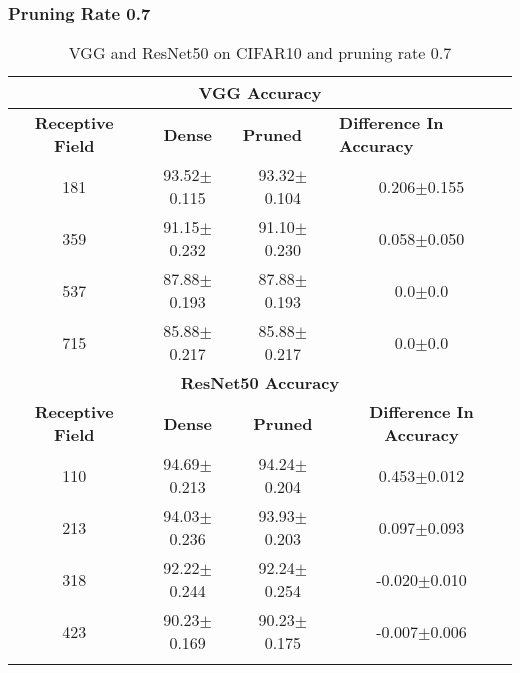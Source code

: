 \subsubsection*{Pruning Rate 0.7}
\begin{table}[H]
  \centering
\begin{tabular}{@{}cccc@{}}
\toprule
\multicolumn{4}{c}{\textbf{VGG Accuracy}}                                                                                                                                  \\ \midrule
\textbf{Receptive Field} & \textbf{Dense} & \multicolumn{1}{l}{\textbf{Pruned}} & \multicolumn{1}{l}{\textbf{Difference In Accuracy}} \\ \midrule
181                      & 93.52$\pm$0.115              & 93.32$\pm$0.104                                   & 0.206$\pm$0.155                                     \\
359                      & 91.15$\pm$0.232              & 91.10$\pm$0.230                                   & 0.058$\pm$0.050                                     \\
537                      & 87.88$\pm$0.193              & 87.88$\pm$0.193                                   & 0.0$\pm$0.0                                         \\
715                      & 85.88$\pm$0.217              & 85.88$\pm$0.217                                   & 0.0$\pm$0.0                                         \\ \midrule
\multicolumn{4}{c}{\textbf{ResNet50 Accuracy}}                                                                                                                             \\ \midrule
\textbf{Receptive Field} & \textbf{Dense} & \textbf{Pruned}                     & \textbf{Difference In Accuracy}                     \\
110                      & 94.69$\pm$0.213              & 94.24$\pm$0.204                                   & 0.453$\pm$0.012                                     \\
213                      & 94.03$\pm$0.236              & 93.93$\pm$0.203                                   & 0.097$\pm$0.093                                     \\
318                      & 92.22$\pm$0.244              & 92.24$\pm$0.254                                   & -0.020$\pm$0.010                                    \\
423                      & 90.23$\pm$0.169              & 90.23$\pm$0.175                                   &
-0.007$\pm$0.006                                    \\ \bottomrule \\
\end{tabular}
\caption{VGG and ResNet50 on CIFAR10 and pruning rate 0.7}
\label{tab:cifar10 pruning rate07}
\end{table}

